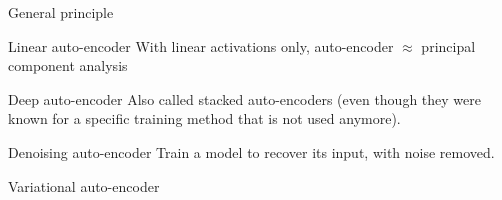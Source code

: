 \begin{frame}{General principle}
\end{frame}

\begin{frame}{Linear auto-encoder}
  With linear activations only, auto-encoder $\approx$ principal component analysis

\end{frame}

\begin{frame}{Deep auto-encoder}
  Also called stacked auto-encoders (even though they were known for a specific training method that is not used anymore).

\end{frame}

\begin{frame}{Denoising auto-encoder}
  Train a model to recover its input, with noise removed.

\end{frame}

\begin{frame}{Variational auto-encoder}
\end{frame}
